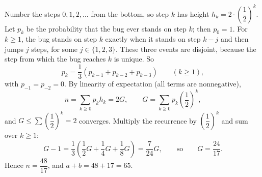 Number the steps $0,1,2,\dots$ from the bottom, so step $k$ has height $h_k=2\cdot\left(\dfrac12\right)^k$. Let $p_k$ be the probability that the bug ever stands on step $k$; then $p_0=1$. For $k\ge1$, the bug stands on step $k$ exactly when it stands on step $k-j$ and then jumps $j$ steps, for some $j\in\{1,2,3\}$. These three events are disjoint, because the step from which the bug reaches $k$ is unique. So
\[p_k=\dfrac13\left(p_{k-1}+p_{k-2}+p_{k-3}\right)\qquad(k\ge1),\]
with $p_{-1}=p_{-2}=0$. By linearity of expectation (all terms are nonnegative),
\[n=\sum_{k\ge0}p_kh_k=2G,\qquad G=\sum_{k\ge0}p_k\left(\dfrac12\right)^k,\]
and $G\le\sum\left(\dfrac12\right)^k=2$ converges. Multiply the recurrence by $\left(\dfrac12\right)^k$ and sum over $k\ge1$:
\[G-1=\dfrac13\left(\dfrac12G+\dfrac14G+\dfrac18G\right)=\dfrac{7}{24}G,\qquad\text{so}\qquad G=\dfrac{24}{17}.\]
Hence $n=\dfrac{48}{17}$, and $a+b=48+17=\boxed{65}$.
